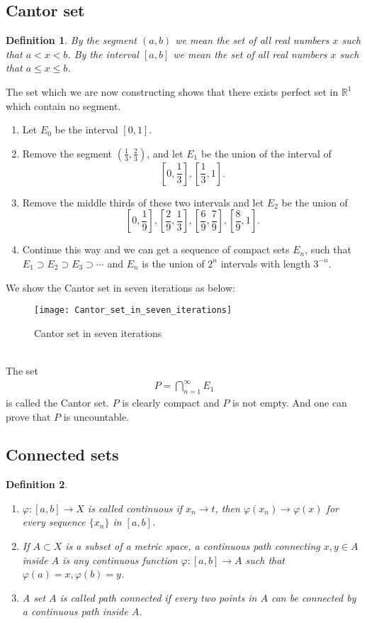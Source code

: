 \documentclass[12pt,leqno]{amsart}
\newtheorem{definition}{Definition}[section]
\theoremstyle{definition}
\numberwithin{equation}{subsection}
\begin{document}
\subsection{Cantor set}
\begin{definition}
By the segment $(a,b)$ we mean the set of all real numbers $x$ such that $a<x<b$. By the interval $[a,b]$ we mean the set of all real numbers $x$ such that $a\leq x\leq b$.
\end{definition}
The set which we are now constructing shows that there exists perfect set in $\mathbb{R}^1$ which contain no segment. 
\begin{enumerate}
    \item Let $E_0$ be the interval $[0,1]$.
    \item Remove the segment $\left(\frac{1}{3},\frac{2}{3}\right)$, and let $E_1$ be the union of the interval of $$\left[0,\frac{1}{3}\right],\left[\frac{1}{3},1\right].$$
    \item Remove the middle thirds of these two intervals and let $E_2$ be the union of $$\left[0,\frac{1}{9}\right],\left[\frac{2}{9},\frac{1}{3}\right],\left[\frac{6}{9},\frac{7}{9}\right],\left[\frac{8}{9},1\right].$$
    \item Continue this way and we can get a sequence of compact sets $E_n$, such that $E_1\supset E_2\supset E_3\supset\cdots$ and $E_n$ is the union of $2^n$ intervals with length $3^{-n}$.
\end{enumerate}

We show the Cantor set in seven iterations as below:
\begin{figure}[h]
    \centering
    \texttt{[image: Cantor\_set\_in\_seven\_iterations]}
    \caption{Cantor set in seven iterations}
    \label{fig:Cantor_set}
\end{figure}\\
The set
\begin{align*}
    P = \bigcap^\infty_{n=1}E_1
\end{align*}
is called the Cantor set. $P$ is clearly compact and $P$ is not empty. And one can prove that $P$ is uncountable.

\medskip

\subsection{Connected sets}
\begin{definition}
~\begin{enumerate}
  \item $\varphi:[a,b]\to X$ is called continuous if $x_n\to t$, then $\varphi(x_n)\to\varphi(x)$ for every sequence $\{x_n\}$ in $[a,b]$. 
  \item If $A\subset X$ is a subset of a metric space, a continuous path connecting $x,y\in A$ inside $A$ is any continuous function $\varphi:[a,b]\to A$ such that $\varphi(a) = x, \varphi(b) = y$.
  \item A set $A$ is called path connected if every two points in $A$ can be connected by a continuous path inside $A$.
\end{enumerate}
\end{definition}
\end{document}
